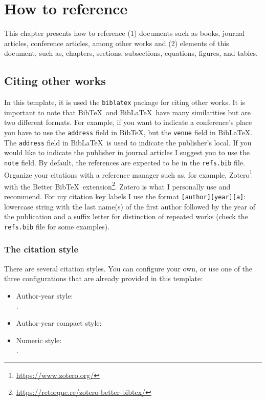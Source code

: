 \chapter{How to reference}
\label{c3}

This chapter presents how to reference (1) documents such as books, journal articles, conference articles, among other works and (2) elements of this document, such as, chapters, sections, subsections, equations, figures, and tables.


\section{Citing other works}
\label{c3:s:citing-other-works}

In this template, it is used the \verb+biblatex+ package for citing other works.
It is important to note that Bib\TeX\ and Bib\LaTeX\ have many similarities but are two different formats.
For example, if you want to indicate a conference's place you have to use the \verb+address+ field in Bib\TeX, but the \verb+venue+ field in Bib\LaTeX.
The \verb+address+ field in Bib\LaTeX\ is used to indicate the publisher's local. If you would like to indicate the publisher in journal articles I suggest you to use the \verb+note+ field.
By default, the references are expected to be in the \verb+refs.bib+ file.
Organize your citations with a reference manager such as, for example, Zotero\footnote{\url{https://www.zotero.org/}} with the Better Bib\TeX\ extension\footnote{\url{https://retorque.re/zotero-better-bibtex/}}.
Zotero is what I personally use and recommend.
For my citation key labels I use the format \texttt{[author][year][a]}: lowercase string with the last name(s) of the first author followed by the year of the publication and a suffix letter for distinction of repeated works (check the \texttt{refs.bib} file for some examples).


\subsection{The citation style}
\label{c3:ss:the-citation-style}

There are several citation styles.
You can configure your own, or use one of the three configurations that are already provided in this template:

\begin{itemize}
\item
Author-year style:\\\verb++.
\item
Author-year compact style:\\\verb++
\item
Numeric style:\\\verb++.
\end{itemize}

